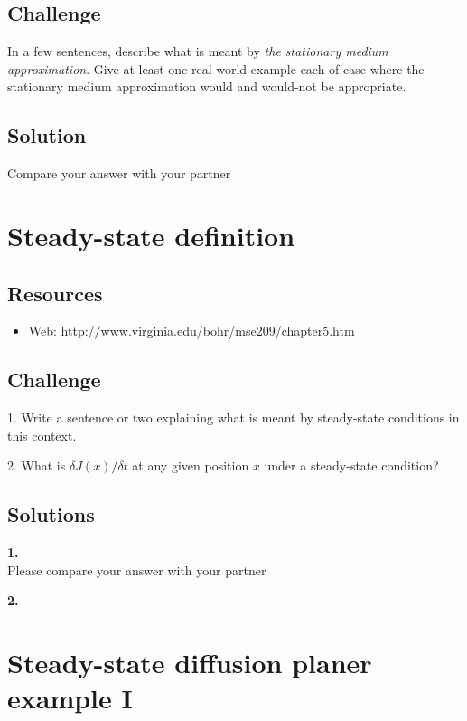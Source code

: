 \subsection*{Challenge}
In a few sentences, describe what is meant by \emph{the stationary medium approximation}. Give at least one real-world example each of case where the stationary medium approximation would and would-not be appropriate.

\subsection*{Solution}
Compare your answer with your partner




\newpage
\section{Steady-state definition}

\subsection*{Resources}
\begin{itemize}
    \item Web: \url{http://www.virginia.edu/bohr/mse209/chapter5.htm}
\end{itemize}

\subsection*{Challenge}
1. Write a sentence or two explaining what is meant by steady-state conditions in this context.

2. What is $\delta J(x) / \delta t$ at any given position $x$ under a steady-state condition?

\subsection*{Solutions}
\textbf{1.}\\
Please compare your answer with your partner

\textbf{2.}\\




\newpage
\section{Steady-state diffusion planer example I}

